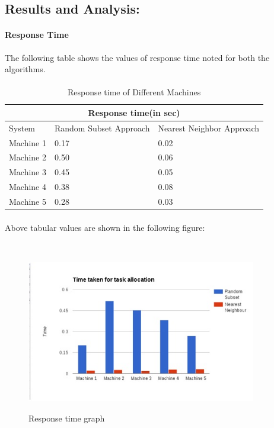 \documentclass[12pt]{article}
\begin{document}
\subsection{Results and Analysis:}
\paragraph{Response Time}
The following table shows the values of response time noted for both the algorithms.
\paragraph{}
\begin{table}[h!]
\centering
 \begin{tabular}
{ |p{4cm}|p{4cm}|p{4cm}|  }
 \hline
 \multicolumn{3}{|c|}{Response time(in sec)} \\
 \hline
 System & Random Subset Approach & Nearest Neighbor Approach\\
 \hline
 Machine 1 & 0.17 & 0.02\\
 Machine 2 & 0.50 & 0.06\\
 Machine 3 & 0.45 & 0.05\\
 Machine 4 & 0.38 & 0.08\\
 Machine 5 & 0.28 & 0.03\\
  \hline
\end{tabular}
\paragraph{}
\centering
    \caption{Response time of Different Machines}
\end{table}
\clearpage
\paragraph{}
Above tabular values are shown in the following figure:
\\
\\
\begin{figure}[h!]
  \centering
    \includegraphics[width=10cm, height=7cm]{fig_4.jpg}
    \centering
    \caption{Response time graph }
\end{figure}
\\
\\
\\
\end{document}
